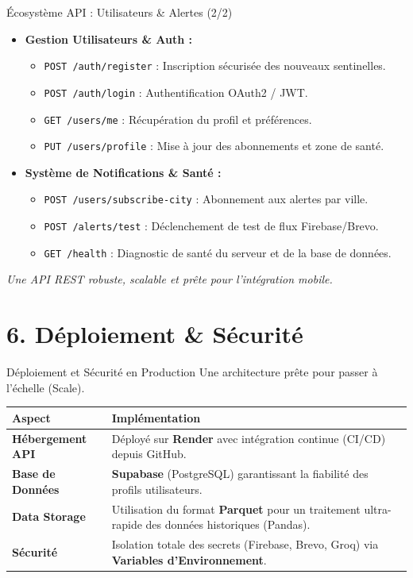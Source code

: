 \documentclass[10pt, aspectratio=169]{beamer}
\begin{document}
\begin{frame}[fragile]{Écosystème API : Utilisateurs \& Alertes (2/2)}
  \begin{itemize}
    \item \textbf{Gestion Utilisateurs \& Auth :}
    \begin{itemize}
      \item \texttt{POST /auth/register} : Inscription sécurisée des nouveaux sentinelles.
      \item \texttt{POST /auth/login} : Authentification OAuth2 / JWT.
      \item \texttt{GET /users/me} : Récupération du profil et préférences.
      \item \texttt{PUT /users/profile} : Mise à jour des abonnements et zone de santé.
    \end{itemize}
    \item \textbf{Système de Notifications \& Santé :}
    \begin{itemize}
      \item \texttt{POST /users/subscribe-city} : Abonnement aux alertes par ville.
      \item \texttt{POST /alerts/test} : Déclenchement de test de flux Firebase/Brevo.
      \item \texttt{GET /health} : Diagnostic de santé du serveur et de la base de données.
    \end{itemize}
  \end{itemize}
  \begin{center}
    \textit{Une API REST robuste, scalable et prête pour l'intégration mobile.}
  \end{center}
\end{frame}

\section{6. Déploiement \& Sécurité}
\begin{frame}{Déploiement et Sécurité en Production}
  Une architecture prête pour passer à l'échelle (Scale).
  \begin{table}
    \centering
    \begin{tabular}{p{3cm} p{7cm}}
      \toprule
      \textbf{Aspect} & \textbf{Implémentation} \\
      \midrule
      \textbf{Hébergement API} & Déployé sur \textbf{Render} avec intégration continue (CI/CD) depuis GitHub. \\
      \textbf{Base de Données} & \textbf{Supabase} (PostgreSQL) garantissant la fiabilité des profils utilisateurs. \\
      \textbf{Data Storage} & Utilisation du format \textbf{Parquet} pour un traitement ultra-rapide des données historiques (Pandas). \\
      \textbf{Sécurité} & Isolation totale des secrets (Firebase, Brevo, Groq) via \textbf{Variables d'Environnement}. \\
      \bottomrule
    \end{tabular}
  \end{table}
\end{frame}
\end{document}
